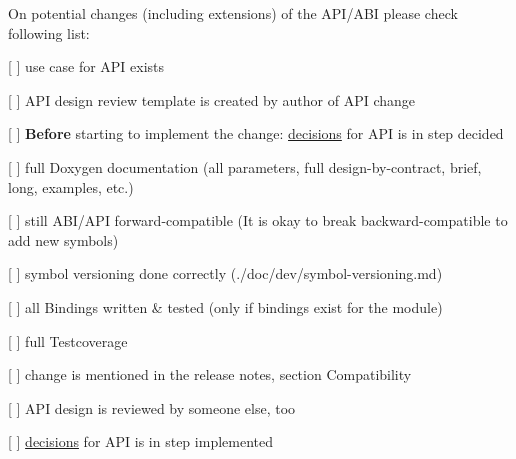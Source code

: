 \label{doc_contrib_api_review_md_md_doc_contrib_api_review}%
%
On potential changes (including extensions) of the API/\+ABI please check following list\+:


\begin{DoxyItemize}
\item \mbox{[} \mbox{]} use case for API exists
\item \mbox{[} \mbox{]} API design review template is created by author of API change
\item \mbox{[} \mbox{]} {\bfseries{Before}} starting to implement the change\+: \mbox{\hyperlink{doc_decisions_README_md}{decisions}} for API is in step {\ttfamily decided}
\item \mbox{[} \mbox{]} full Doxygen documentation (all parameters, full design-\/by-\/contract, brief, long, examples, etc.)
\item \mbox{[} \mbox{]} still ABI/\+API forward-\/compatible (It is okay to break backward-\/compatible to add new symbols)
\item \mbox{[} \mbox{]} symbol versioning done correctly (./doc/dev/symbol-\/versioning.md)
\item \mbox{[} \mbox{]} all Bindings written \& tested (only if bindings exist for the module)
\item \mbox{[} \mbox{]} full Testcoverage
\item \mbox{[} \mbox{]} change is mentioned in the release notes, section {\ttfamily Compatibility}
\item \mbox{[} \mbox{]} API design is reviewed by someone else, too
\item \mbox{[} \mbox{]} \mbox{\hyperlink{doc_decisions_README_md}{decisions}} for API is in step {\ttfamily implemented} 
\end{DoxyItemize}